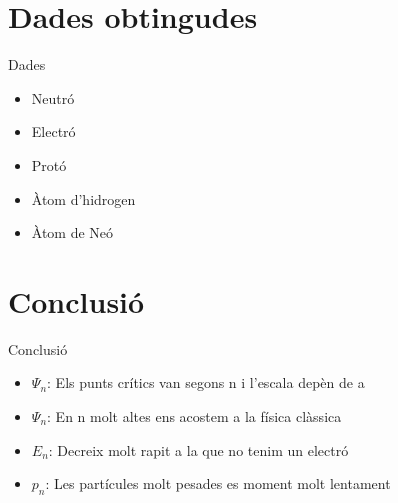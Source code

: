 \documentclass{beamer}
\begin{document}
\section{Dades obtingudes}
\begin{frame}{Dades}
    \begin{itemize}
        \item Neutró
        \item Electró
        \item Protó
        \item Àtom d'hidrogen
        \item Àtom de Neó
    \end{itemize}{}
\end{frame}{}

\section{Conclusió}
\begin{frame}{Conclusió}
    \begin{itemize}
        \item $\Psi_n$: Els punts crítics van segons n i l'escala depèn de a
        \item $\Psi_n$: En n molt altes ens acostem a la física clàssica        
        \item $E_n$: Decreix molt rapit a la que no tenim un electró
        \item $p_n$: Les partícules molt pesades es moment molt lentament
    \end{itemize}{}
\end{frame}{}
\end{document}

